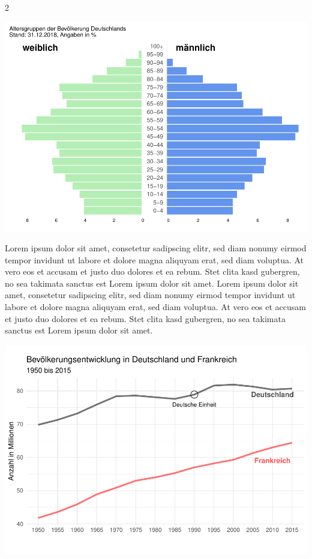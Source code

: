 \documentclass[
  a4paper,
  twoside]{article}
\begin{document}
\begin {multicols}{2}
\columnbreak

\includegraphics[width=1\linewidth]{2021-03-02_Beispiel_files/figure-latex/plot Pyramide 2-spaltig-1}

Lorem ipsum dolor sit amet, consetetur sadipscing elitr, sed diam nonumy eirmod tempor invidunt ut labore et dolore magna aliquyam erat, sed diam voluptua. At vero eos et accusam et justo duo dolores et ea rebum. Stet clita kasd gubergren, no sea takimata sanctus est Lorem ipsum dolor sit amet. Lorem ipsum dolor sit amet, consetetur sadipscing elitr, sed diam nonumy eirmod tempor invidunt ut labore et dolore magna aliquyam erat, sed diam voluptua. At vero eos et accusam et justo duo dolores et ea rebum. Stet clita kasd gubergren, no sea takimata sanctus est Lorem ipsum dolor sit amet.

\includegraphics[width=1\linewidth]{2021-03-02_Beispiel_files/figure-latex/unnamed-chunk-2-1}

\end {multicols}
\end{document}
